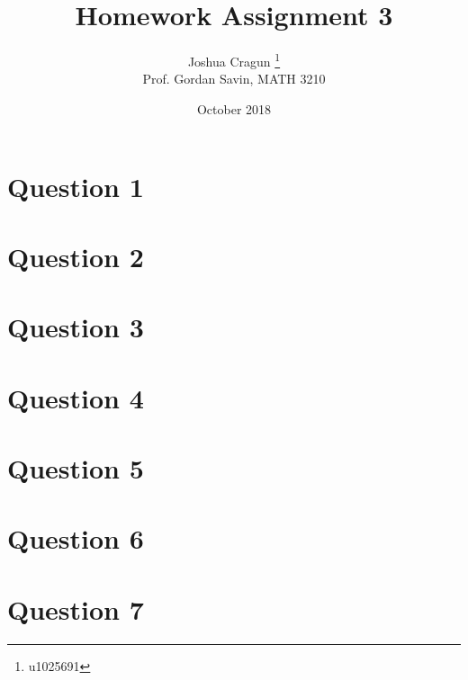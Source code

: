 \documentclass[12pt, letterpaper]{article}
\title{Homework Assignment 3}
\author{Joshua Cragun \thanks{u1025691} \\ Prof. Gordan Savin, MATH 3210}
\date{October 2018}
\begin{document}
\begin{titlepage}
\maketitle
\end{titlepage}

\pagebreak

\section*{Question 1}
\section*{Question 2}
\section*{Question 3}
\section*{Question 4}
\section*{Question 5}
\section*{Question 6}
\section*{Question 7}
\end{document}
